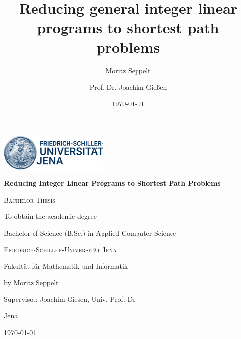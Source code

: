 \documentclass{report}
\title{Reducing general integer linear programs to shortest path problems}
\author{Moritz Seppelt \and Prof. Dr. Joachim Gießen}
\date{\today}
\theoremstyle{definition}
\begin{document}
\begin{titlepage}
  \centering
  \vspace*{0.5cm}
  \includegraphics[width=0.4\textwidth]{uni_jena_logo.png}\par
  \vspace{1cm}
  {\LARGE\textbf{Reducing Integer Linear Programs to Shortest Path Problems}\par}
  \vspace{1.5cm}
  {\Large \textsc{Bachelor Thesis}\par}
  \vspace{1.5cm}
  {\Large To obtain the academic degree\par}
  \vspace{0.5cm}
  {\Large Bachelor of Science (B.Sc.) in Applied Computer Science\par}
  \vspace{1.5cm}
  {\Large \textsc{Friedrich-Schiller-Universität Jena}\par}
  \vspace{0.5cm}
  {\Large Fakultät für Mathematik und Informatik\par}
  \vspace{0.5cm}
  {\Large \par}
  \vfill
  {\large by Moritz Seppelt\par} %
  \vspace{0.5cm}
  {\large Supervisor: Joachim Giesen, Univ.-Prof. Dr \par}
  \vfill
  {\large Jena\par}
  {\large \today\par} %
\end{titlepage}

\tableofcontents





% 

\newpage
\thispagestyle{empty}
\end{document}
